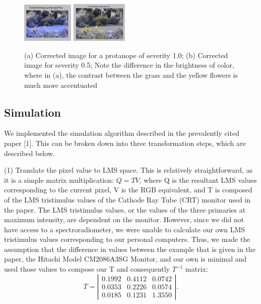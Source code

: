 \documentclass[10pt,twocolumn,letterpaper]{article}
\begin{document}
\begin{figure}[h]
  \includegraphics[width=0.22\textwidth]{sev1.png}
  \includegraphics[width=0.24\textwidth]{sev2.png}
  \caption{(a) Corrected image for a protanope of severity 1.0; (b) Corrected image for severity 0.5; Note the difference in the brightness of color, where in (a), the contrast between the grass and the yellow flowers is much more accentuated}
  \label{fig:sev}
\end{figure}

\subsection{Simulation}

We implemented the simulation algorithm described in the prevalently cited paper [1]. This can be broken down into three transformation steps, which are described below.

(1) Translate the pixel value to LMS space. This is relatively straightforward, as it is a simple matrix multiplication: $Q = TV$, where Q is the resultant LMS values corresponding to the current pixel, V is the RGB equivalent, and T is composed of the LMS tristimulus values of the Cathode Ray Tube (CRT) monitor used in the paper. The LMS tristimulus values, or the values of the three primaries at maximum intensity, are dependent on the monitor. However, since we did not have access to a spectroradiometer, we were unable to calculate our own LMS tristimulus values corresponding to our personal computers. Thus, we made the assumption that the difference in values between the example that is given in the paper, the Hitachi Model CM2086A3SG Monitor, and our own is minimal and used those values to compose our T and consequently $T^{-1}$ matrix: 
\[ T = \left| \begin{array}{ccc}
0.1992 & 0.4112 & 0.0742 \\
0.0353 & 0.2226 & 0.0574 \\
0.0185 & 0.1231 & 1.3550 \end{array} \right|.\]
\end{document}
